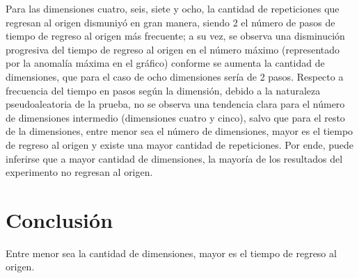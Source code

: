 \documentclass{article}
\begin{document}
Para las dimensiones cuatro, seis, siete y ocho, la cantidad de repeticiones que regresan al origen dismuniyó en gran manera, siendo 2 el número de pasos de tiempo de regreso al origen más frecuente; a su vez, se observa una disminución progresiva del tiempo de regreso al origen en el número máximo (representado por la anomalía máxima en el gráfico) conforme se aumenta la cantidad de dimensiones, que para el caso de ocho dimensiones sería de 2 pasos. Respecto a frecuencia del tiempo en pasos según la dimensión, debido a la naturaleza pseudoaleatoria de la prueba, no se observa una tendencia clara para el número de dimensiones intermedio (dimensiones cuatro y cinco), salvo que para el resto de la dimensiones, entre menor sea el número de dimensiones, mayor es el tiempo de regreso al origen y existe una mayor cantidad de repeticiones. Por ende, puede inferirse que a mayor cantidad de dimensiones, la mayoría de los resultados del experimento no regresan al origen.

\section{Conclusión}
Entre menor sea la cantidad de dimensiones, mayor es el tiempo de regreso al origen.



\end{document}
